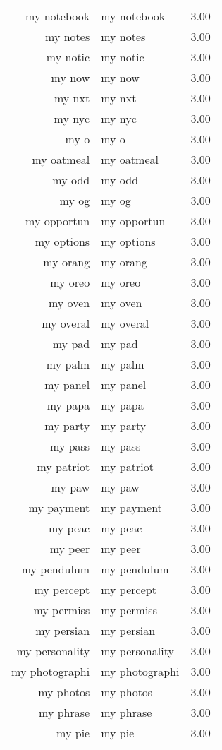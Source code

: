 \begin{table}[ht]
\begin{tabular}{rlr}
  my notebook & my notebook & 3.00 \\ 
  my notes & my notes & 3.00 \\ 
  my notic & my notic & 3.00 \\ 
  my now & my now & 3.00 \\ 
  my nxt & my nxt & 3.00 \\ 
  my nyc & my nyc & 3.00 \\ 
  my o & my o & 3.00 \\ 
  my oatmeal & my oatmeal & 3.00 \\ 
  my odd & my odd & 3.00 \\ 
  my og & my og & 3.00 \\ 
  my opportun & my opportun & 3.00 \\ 
  my options & my options & 3.00 \\ 
  my orang & my orang & 3.00 \\ 
  my oreo & my oreo & 3.00 \\ 
  my oven & my oven & 3.00 \\ 
  my overal & my overal & 3.00 \\ 
  my pad & my pad & 3.00 \\ 
  my palm & my palm & 3.00 \\ 
  my panel & my panel & 3.00 \\ 
  my papa & my papa & 3.00 \\ 
  my party & my party & 3.00 \\ 
  my pass & my pass & 3.00 \\ 
  my patriot & my patriot & 3.00 \\ 
  my paw & my paw & 3.00 \\ 
  my payment & my payment & 3.00 \\ 
  my peac & my peac & 3.00 \\ 
  my peer & my peer & 3.00 \\ 
  my pendulum & my pendulum & 3.00 \\ 
  my percept & my percept & 3.00 \\ 
  my permiss & my permiss & 3.00 \\ 
  my persian & my persian & 3.00 \\ 
  my personality & my personality & 3.00 \\ 
  my photographi & my photographi & 3.00 \\ 
  my photos & my photos & 3.00 \\ 
  my phrase & my phrase & 3.00 \\ 
  my pie & my pie & 3.00 \\ 

\end{tabular}
\end{table}
